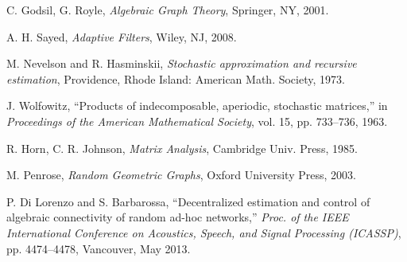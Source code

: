 \documentclass[10pt,twocolumn]{IEEEtran}
\begin{document}
\begin{thebibliography}{1}
C. Godsil, G. Royle, {\it Algebraic Graph Theory}, Springer, NY, 2001.

A. H. Sayed, {\it Adaptive Filters}, Wiley, NJ, 2008.

M. Nevelson and R. Hasminskii, \textit{Stochastic approximation and recursive estimation}, Providence, Rhode Island: American Math. Society, 1973.

J. Wolfowitz, ``Products of indecomposable, aperiodic, stochastic matrices,'' in {\it Proceedings of the American Mathematical Society}, vol. 15, pp. 733--736, 1963.

R. Horn, C. R. Johnson, {\it Matrix Analysis}, Cambridge Univ. Press, 1985.

M. Penrose, {\it Random Geometric Graphs}, Oxford University Press, 2003.

P. Di Lorenzo and S. Barbarossa, ``Decentralized estimation and control of algebraic connectivity of random ad-hoc networks,'' {\it Proc. of the IEEE International Conference on Acoustics, Speech, and Signal Processing (ICASSP)}, pp. 4474--4478, Vancouver, May 2013.


\end{thebibliography}
\end{document}
